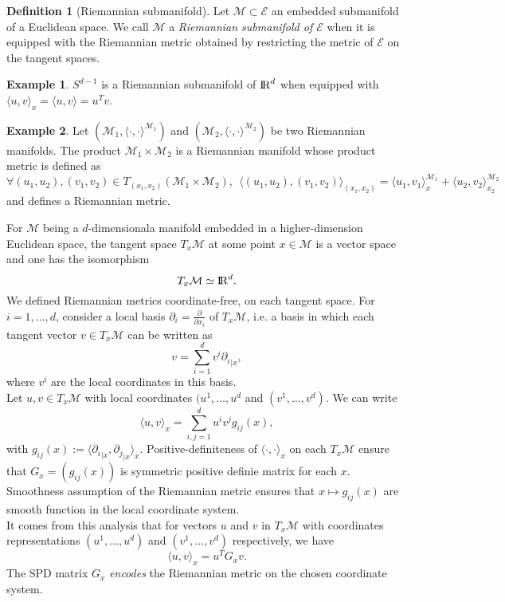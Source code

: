 \documentclass[10pt,a4paper]{book}
\theoremstyle{definition}
\newtheorem{defn}{Definition}[section]
\newtheorem{exm}{Example}[section]
\theoremstyle{plain}
\theoremstyle{remark}
\newcommand{\E}{\mathcal{E}}
\newcommand \M {\mathcal{M}}
\def\R{{\rm I\kern-0.16em R}}
\begin{document}
\begin{defn}[Riemannian submanifold]
Let $\M \subset \E$ an embedded submanifold of a Euclidean space. We call $\M$ a \emph{Riemannian submanifold of $\E$} when it is equipped with the Riemannian metric obtained by restricting the metric of $\E$ on the tangent spaces.
\end{defn}
\begin{exm}
$S^{d-1}$ is a Riemannian submanifold of $\R^d$ when equipped with $\langle u,v\rangle_x =\langle u,v\rangle=u^{T}v$.
\end{exm}
\begin{exm}
Let $(\M_1, \langle \cdot,\cdot\rangle^{\M_1})$ and $(\M_2,\langle \cdot,\cdot \rangle^{\M_2})$ be two Riemannian manifolds. The product $\M_1\times \M_2$ is a Riemannian manifold whose product metric is defined as
$$\forall (u_1,u_2),(v_1,v_2)\in T_{(x_1,x_2)}(\M_1\times \M_2),~~\langle (u_1,u_2),(v_1,v_2)\rangle_{(x_1,x_2)}=\langle u_1,v_1\rangle_x^{\M_1}+\langle u_2,v_2\rangle_{x_2}^{\M_2}$$
and defines a Riemannian metric.
\end{exm}

For $\M$ being a $d$-dimensionala manifold embedded in a higher-dimension Euclidean space, the tangent space $T_x\M$ at some point $x\in \M$ is a vector space and one has the isomorphism
$$T_x\M\simeq \R^d.$$
We defined Riemannian metrics coordinate-free, on each tangent space. For $i=1,\dots, d$, consider a local basis $\partial_i=\frac{\partial}{\partial x_i}$ of $T_x\M$, i.e. a basis in which each tangent vector $v\in T_x\M$ can be written as
$$v=\sum_{i=1}^{d}v^{i}{\partial_i}_{\mid x},$$
where $v^{i}$ are the local coordinates in this basis.\\
Let $u,v \in T_x\M$ with local coordinates $(u^1,\dots,u^{d}$ and $(v^1,\dots, v^d)$. We can write
\[
\langle u,v\rangle_x=\sum_{i,j=1}^{d}u^{i}v^{j}g_{ij}(x),
\]
with $g_{ij}(x):=\langle {\partial_i}_{\mid x}, {\partial_j}_{\mid x}\rangle_x$. Positive-definiteness of $\langle \cdot, \cdot \rangle_x$ on each $T_x\M$ ensure that $G_x=(g_{ij}(x))$ is symmetric positive definie matrix for each $x$. \\ Smoothness assumption of the Riemannian metric ensures that $x\mapsto g_{ij}(x)$ are smooth function in the local coordinate system. \\
It comes from this analysis that for vectors $u$ and $v$ in $T_x\M$ with coordinates representations $(u^{1},\dots, u^{d})$ and $(v^{1},\dots,v^{d})$ respectively, we have
$$\langle u,v\rangle_x=u^{T}G_xv.$$
The SPD matrix $G_x$ \emph{encodes} the Riemannian metric on the chosen coordinate system.
\end{document}
